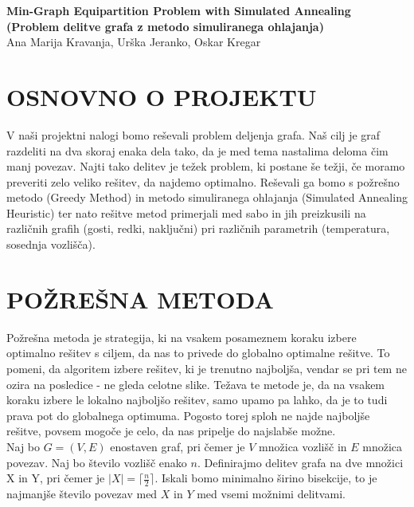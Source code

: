 \documentclass[12pt,a4paper]{amsart}
\theoremstyle{definition} %
\theoremstyle{plain} %
\newcommand{\naslovdela}{Min-Graph Equipartition Problem with Simulated Annealing \\  (Problem delitve grafa z metodo simuliranega ohlajanja)}
\newcommand{\letnica}{2019}
\begin{document}
\thispagestyle{empty}
\vfill

\begin{center}{\large
{\bf \naslovdela}\\[10mm]
Ana Marija Kravanja, Urška Jeranko, Oskar Kregar}\\[1cm]

\end{center}
\vfill

\noindent{\large
Ljubljana, \letnica}
\pagebreak


\section{\textbf{OSNOVNO O PROJEKTU}}
V naši projektni nalogi bomo reševali problem deljenja grafa. Naš cilj je graf razdeliti na dva skoraj enaka dela tako, da je med tema nastalima deloma čim manj povezav. Najti tako delitev je težek problem, ki postane še težji, če moramo preveriti zelo veliko rešitev, da najdemo optimalno. Reševali ga bomo s požrešno metodo (Greedy Method) in metodo simuliranega ohlajanja (Simulated Annealing Heuristic) ter nato rešitve metod primerjali med sabo in jih preizkusili na različnih grafih (gosti, redki, naključni) pri različnih parametrih (temperatura, sosednja vozlišča). 

\section{\textbf{POŽREŠNA METODA}}
Požrešna metoda je strategija, ki na vsakem posameznem koraku izbere optimalno rešitev s ciljem, da nas to privede do globalno optimalne rešitve. To pomeni, da algoritem izbere rešitev, ki je trenutno najboljša, vendar se pri tem ne ozira na posledice - ne gleda celotne slike. Težava te metode je, da na vsakem koraku izbere le lokalno najboljšo rešitev, samo upamo pa lahko, da je to tudi prava pot do globalnega optimuma. Pogosto torej sploh ne najde najboljše rešitve, povsem mogoče je celo, da nas pripelje do najslabše možne. \\

Naj bo $G=(V,E)$ enostaven graf, pri čemer je $V$ množica vozlišč in $E$ množica povezav. Naj bo število vozlišč enako $n$. Definirajmo delitev grafa na dve množici X in Y, pri čemer je $|X| = \lceil \frac{n}{2} \rceil$. Iskali bomo minimalno širino bisekcije, to je najmanjše število povezav med $X$ in $Y$ med vsemi možnimi delitvami. 
\end{document}
